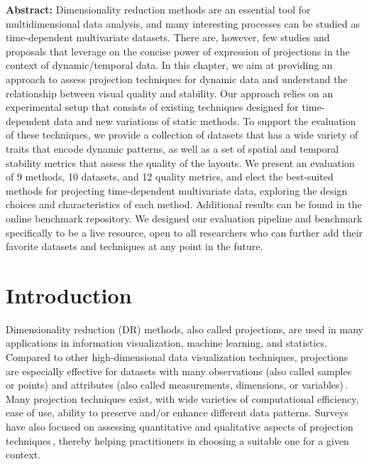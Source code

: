 \vspace{5mm} %


\noindent \textbf{Abstract:}
Dimensionality reduction methods are an essential tool for multidimensional data analysis, and many interesting processes can be studied as time-dependent multivariate datasets. There are, however, few studies and proposals that leverage on the concise power of expression of projections in the context of dynamic/temporal data.  In this chapter, we aim at providing an approach to assess projection techniques for dynamic data and understand the relationship between visual quality and stability. Our approach relies on an experimental setup that consists of existing techniques designed for time-dependent data and new variations of static methods. To support the evaluation of these techniques, we provide a collection of datasets that has a wide variety of traits that encode dynamic patterns, as well as a set of spatial and temporal stability metrics that assess the quality of the layouts.  We present an evaluation of 9 methods, 10 datasets, and 12 quality metrics, and elect the best-suited methods for projecting time-dependent multivariate data, exploring the design choices and characteristics of each method. Additional results can be found in the online benchmark repository. We designed our evaluation pipeline and benchmark specifically to be a live resource, open to all researchers who can further add their favorite datasets and techniques at any point in the future.

\section{Introduction}
%
Dimensionality reduction (DR) methods, also called projections, are used in many applications in information visualization, machine learning, and statistics. Compared to other high-dimensional data visualization techniques, projections are especially effective for datasets with many observations (also called samples or points) and attributes (also called measurements, dimensions, or variables)\,\citep{Liu2017}. Many projection techniques exist, with wide varieties of computational efficiency, ease of use, ability to preserve and/or enhance different data patterns. Surveys have also focused on assessing quantitative and qualitative aspects of projection techniques\,\citep{Nonato2019,vanderMaaten2009,Espadoto19}, thereby helping practitioners in choosing a suitable one for a given context.

